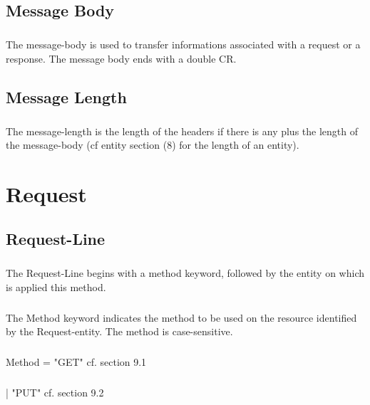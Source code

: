     \section{Message Body}
        \paragraph{}
   The message-body is used to transfer informations associated with a
   request or a response. The message body ends with a double CR.

    \section{Message Length}
        \paragraph{}
   The message-length is the length of the headers if there is any plus
   the length of the message-body (cf entity section (8) for the length
   of an entity).


    \clearpage
\chapter{Request}
    \section{Request-Line}
        \paragraph{}
   The Request-Line begins with a method keyword, followed by the entity
   on which is applied this method.
        \paragraph{}
   The Method keyword indicates the method to be used on the resource
   identified by the Request-entity. The method is case-sensitive.
        \paragraph{}
       Method         = "GET"                    cf. section 9.1
        \paragraph{}
                      | "PUT"                    cf. section 9.2
